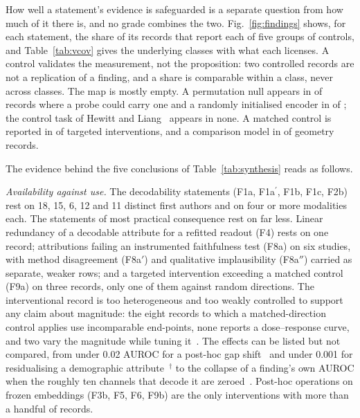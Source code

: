 How well a statement's evidence is safeguarded is a separate question from how much of it there is, and
no grade combines the two. Fig.~\ref{fig:findings} shows, for each statement, the share of its records
that report each of five groups of controls, and Table~\ref{tab:vcov} gives the \Vnclasses{} underlying
classes with what each licenses. A control validates the measurement, not the proposition: two
controlled records are not a replication of a finding, and a share is comparable within a class, never
across classes. The map is mostly empty. A permutation null appears in \Vperm{} of \Vpermn{} records
where a probe could carry one and a randomly initialised encoder in \Vlrn{} of \Vlrnn{}; the control
task of Hewitt and Liang~\cite{hewitt2019designing} appears in none. A matched control is reported in
\Vspc{} of \Vspcn{} targeted interventions, and a comparison model in \Vcomp{} of \Vcompn{} geometry
records.





The evidence behind the five conclusions of Table~\ref{tab:synthesis} reads as follows.

\emph{Availability against use.} The decodability statements (F1a, F1a$^{\prime}$, F1b, F1c, F2b) rest
on 18, 15, 6, 12 and 11 distinct first authors and on four or more modalities each. The statements of
most practical consequence rest on far less. Linear redundancy of a decodable attribute for a refitted
readout (F4) rests on one record; attributions failing an instrumented faithfulness test (F8a) on six
studies, with method disagreement (F8a$'$) and qualitative implausibility (F8a$''$) carried as separate,
weaker rows; and a targeted intervention exceeding a matched control (F9a) on three records, only one
of them against random directions. The interventional record is too heterogeneous and too weakly
controlled to support any claim about magnitude: the eight records to which a matched-direction control
applies use incomparable end-points, none reports a dose--response curve, and two vary the magnitude
while tuning it~\cite{chen2026vihd,nooralahzadeh2026universal}. The effects can be listed but not
compared, from under 0.02 AUROC for a post-hoc gap shift~\cite{restrepo2026cone} and under 0.001 for
residualising a demographic attribute~\cite{kim2026encoding}$^{\dagger}$ to the collapse of a finding's
own AUROC when the roughly ten channels that decode it are zeroed~\cite{nooralahzadeh2026sparse}.
Post-hoc operations on frozen embeddings (F3b, F5, F6, F9b) are the only interventions with more than a
handful of records.

